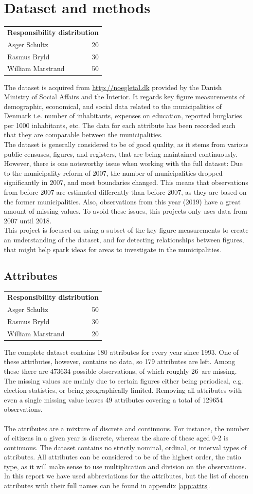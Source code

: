 \documentclass[11pt,fleqn]{article}
\newcommand{\respdist}[3]{
	\vspace*{-.5cm}
	\begin{table}[H]
	\small
		\begin{tabular}{l r}
			\multicolumn{2}{l}{\textbf{Responsibility distribution}}	\\
			Asger Schultz&	#1\pro\\
			Rasmus Bryld&	#2\pro\\
			William Marstrand&#3\pro
		\end{tabular}
	\end{table}
	\vspace*{-.3cm}
}
\numberwithin{footnote}{section}
\numberwithin{figure}{section}
\numberwithin{table}{section}
\begin{document}
\clearpage

\section{Dataset and methods}
\respdist{20}{30}{50}
The dataset is acquired  from \url{http://noegletal.dk} provided by the Danish Ministry of Social Affairs and the Interior. It regards key figure measurements of demographic, economical, and social data related to the municipalities of Denmark i.e. number of inhabitants, expenses on education, reported burglaries per 1000 inhabitants, etc.
The data for each attribute has been recorded such that they are comparable between the municipalities.
\\
The dataset is generally considered to be of good quality, as it stems from various public censuses, figures, and registers, that are being maintained continuously.
However, there is one noteworthy issue when working with the full dataset: Due to the municipality reform of 2007, the number of municipalities dropped significantly in 2007, and most boundaries changed.
This means that observations from before 2007 are estimated differently than before 2007, as they are based on the former municipalities.
Also, observations from this year (2019) have a great amount of missing values. 
To avoid these issues, this projects only uses data from 2007 until 2018.
\\
This project is focused on using a subset of the key figure measurements to create an understanding of the dataset, and for detecting relationships between figures, that might help spark ideas for areas to investigate in the municipalities.

\subsection{Attributes}
\respdist{50}{30}{20}
The complete dataset contains 180 attributes for every year since 1993.
One of these attributes, however, contains no data, so 179 attributes are left.
Among these there are 473634 possible observations, of which roughly 26\pro\ are missing.
The missing values are mainly due to certain figures either being periodical, e.g. election statistics, or being geographically limited.
Removing all attributes with even a single missing value leaves 49 attributes covering a total of 129654 observations.\\
\\
The attributes are a mixture of discrete and continuous.
For instance, the number of citizens in a given year is discrete, whereas the share of these aged 0-2 is continuous.
The dataset contains no strictly nominal, ordinal, or interval types of attributes.
All attributes can be considered to be of the highest order, the ratio type, as it will make sense to use multiplication and division on the observations.\\
In this report we have used abbreviations for the attributes, but the list of chosen attributes with their full names can be found in appendix \ref{app:attrs}.
\end{document}
